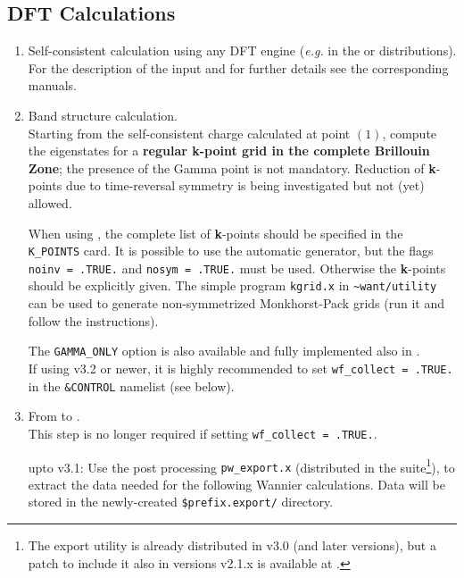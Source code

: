 \subsection{DFT Calculations}
\label{subsection:run_dft}
\renewcommand{\theenumi}{\roman{enumi}}
\renewcommand{\labelenumi}{(\theenumi)}
\begin{enumerate}
%
\item Self-consistent calculation using any DFT engine ({\it e.g.} 
      in the \QUANTUMESPRESSO{} or \ABINIT{} distributions). 
      For the description of the input and for further details see 
      the corresponding manuals.
\item Band structure calculation.\\
      \noindent  Starting from the self-consistent charge
      calculated at point $(1)$, compute the eigenstates for a
      {\bf regular {\bf k}-point grid in the complete Brillouin Zone}; the presence of
      the Gamma point is not mandatory. 
      Reduction of \textbf{k}-points due to time-reversal symmetry is being
      investigated but not (yet) allowed. 

      When using \QUANTUMESPRESSO{}, the complete list of
      \textbf{k}-points should be specified in the {\tt K\_POINTS} card.
      It is possible to use the automatic generator, but the flags
      {\tt noinv = .TRUE.} and {\tt nosym = .TRUE.} must be used.
      Otherwise the \textbf{k}-points should be explicitly given. The simple program
      {\tt kgrid.x} in {\tt \~{}want/utility} can be used to generate non-symmetrized
      Monkhorst-Pack grids (run it and follow the instructions).
      
      The {\tt GAMMA\_ONLY} option is also available and fully implemented also in \WANT.
      \\
      If using \QUANTUMESPRESSO{} v3.2 or newer, it is highly recommended to set
      {\tt wf\_collect = .TRUE.} in the {\tt \&CONTROL} namelist (see below). 
\item From \QUANTUMESPRESSO{} to \WANT.\\
      This step is no longer required if setting {\tt wf\_collect = .TRUE.}. 

      \noindent \QUANTUMESPRESSO{} upto v3.1: Use the post processing
      {\tt pw\_export.x} (distributed in the \QUANTUMESPRESSO{} suite\footnote{
      The export utility is already distributed in
      \QUANTUMESPRESSO{} v3.0 (and later versions), but a patch to include it also in 
      versions v2.1.x is available at \WANTURL{}.}),
      to extract the data needed for the following Wannier
      calculations. Data will be stored in the
      newly-created \texttt{\$prefix.export/} directory.  \\
     

\end{enumerate}
